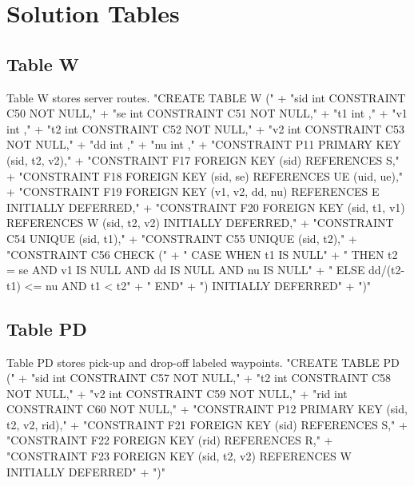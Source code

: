 \section{Solution Tables}

\subsection{Table W}
Table W stores server routes.
\nwenddocs{}\endmoddef{}
"CREATE TABLE W ("
  + "sid int  CONSTRAINT C50 NOT NULL,"
  + "se  int  CONSTRAINT C51 NOT NULL,"
  + "t1  int  ,"
  + "v1  int  ,"
  + "t2  int  CONSTRAINT C52 NOT NULL,"
  + "v2  int  CONSTRAINT C53 NOT NULL,"
  + "dd  int ,"
  + "nu  int ,"
  + "CONSTRAINT P11 PRIMARY KEY (sid, t2, v2),"
  + "CONSTRAINT F17 FOREIGN KEY (sid) REFERENCES S,"
  + "CONSTRAINT F18 FOREIGN KEY (sid, se) REFERENCES UE (uid, ue),"
  + "CONSTRAINT F19 FOREIGN KEY (v1, v2, dd, nu) REFERENCES E INITIALLY DEFERRED,"
  + "CONSTRAINT F20 FOREIGN KEY (sid, t1, v1) REFERENCES W (sid, t2, v2) INITIALLY DEFERRED,"
  + "CONSTRAINT C54 UNIQUE (sid, t1),"
  + "CONSTRAINT C55 UNIQUE (sid, t2),"
  + "CONSTRAINT C56 CHECK ("
  + "  CASE WHEN t1 IS NULL"
  + "    THEN t2 = se AND v1 IS NULL AND dd IS NULL AND nu IS NULL"
  + "    ELSE dd/(t2-t1) <= nu AND t1 < t2"
  + "  END"
  + ") INITIALLY DEFERRED"
  + ")"
\nwendcode{}\nwdocspar

\subsection{Table PD}
Table PD stores pick-up and drop-off labeled waypoints.
\nwenddocs{}\endmoddef{}
"CREATE TABLE PD ("
  + "sid int  CONSTRAINT C57 NOT NULL,"
  + "t2  int  CONSTRAINT C58 NOT NULL,"
  + "v2  int  CONSTRAINT C59 NOT NULL,"
  + "rid int  CONSTRAINT C60 NOT NULL,"
  + "CONSTRAINT P12 PRIMARY KEY (sid, t2, v2, rid),"
  + "CONSTRAINT F21 FOREIGN KEY (sid) REFERENCES S,"
  + "CONSTRAINT F22 FOREIGN KEY (rid) REFERENCES R,"
  + "CONSTRAINT F23 FOREIGN KEY (sid, t2, v2) REFERENCES W INITIALLY DEFERRED"
  + ")"
\nwendcode{}\nwdocspar

